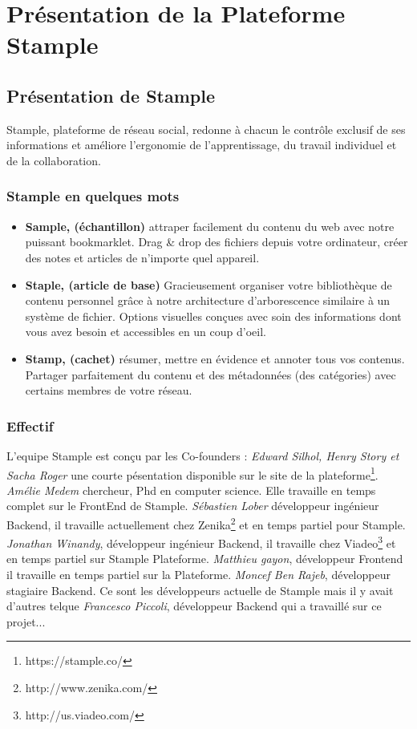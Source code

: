 \chapter{Présentation de la Plateforme Stample}
\section{Présentation de Stample}
Stample, plateforme de réseau social, redonne à chacun le contrôle exclusif de ses informations et améliore l'ergonomie de l'apprentissage, du travail individuel et de la collaboration.
\subsection{Stample en quelques mots}
\begin{itemize}
\item \textbf{Sample, (échantillon)} attraper facilement du contenu du web avec notre puissant bookmarklet. Drag \& drop des fichiers depuis votre ordinateur, créer des notes et articles de n'importe quel appareil.
\item \textbf{Staple, (article de base)} Gracieusement organiser votre bibliothèque de contenu personnel grâce à notre architecture d'arborescence similaire à un système de fichier.
Options visuelles conçues avec soin des informations dont vous avez besoin et accessibles en un coup d'oeil.
\item \textbf{Stamp, (cachet)} résumer, mettre en évidence et annoter tous vos contenus.
Partager parfaitement du contenu et des métadonnées (des catégories) avec certains membres de votre réseau.
\end{itemize}
\subsection{Effectif}
L'equipe Stample est conçu par les Co-founders :
\textit{Edward Silhol, Henry Story et Sacha Roger} une courte pésentation disponible sur le site de la plateforme\footnote{https://stample.co/}.\newline
\textit{Amélie Medem} chercheur, Phd en computer science. Elle travaille en temps complet sur le FrontEnd de Stample.\newline
\textit{Sébastien Lober} développeur ingénieur Backend, il travaille actuellement chez Zenika\footnote{http://www.zenika.com/} et en temps partiel pour Stample.\newline
\textit{Jonathan Winandy}, développeur ingénieur Backend, il travaille chez Viadeo\footnote{http://us.viadeo.com/} et en temps partiel sur Stample Plateforme.\newline
\textit{Matthieu gayon}, développeur Frontend il travaille en temps partiel sur la Plateforme.\newline
\textit{Moncef Ben Rajeb}, développeur stagiaire Backend.\newline
Ce sont les développeurs actuelle de Stample mais il y avait d'autres telque \textit{Francesco Piccoli}, développeur Backend qui a travaillé sur ce projet...
